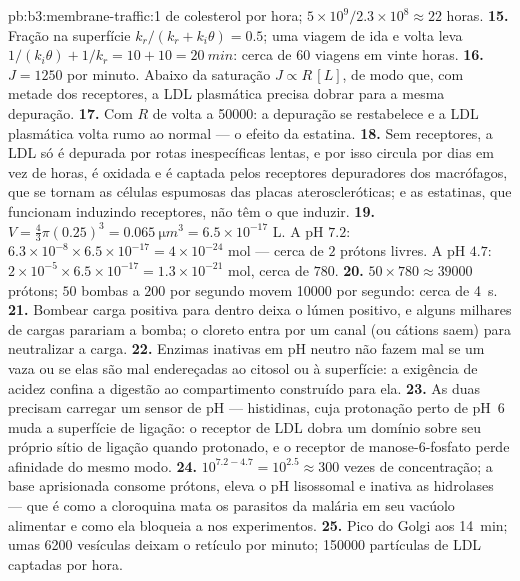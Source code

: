 \begin{solution}{pb:b3:membrane-traffic:1}
de colesterol por hora; $5\times 10^{9}/2.3\times 10^{8} \approx 22$
horas.
\textbf{15.} Fração na superfície $k_{r}/(k_{r} + k_{i}\theta) = 0.5$;
uma viagem de ida e volta leva $1/(k_{i}\theta) + 1/k_{r} = 10 + 10 = \qty{20}{min}$: cerca de $60$ viagens em vinte horas.
\textbf{16.} $J = 1250$ por minuto. Abaixo da saturação
$J \propto R\,[L]$, de modo que, com metade dos receptores, a LDL
plasmática precisa dobrar para a mesma depuração.
\textbf{17.} Com $R$ de volta a \num{50000}: a depuração se restabelece
e a LDL plasmática volta rumo ao normal --- o efeito da estatina.
\textbf{18.} Sem receptores, a LDL só é depurada por rotas
inespecíficas lentas, e por isso circula por dias em vez de horas, é
oxidada e é captada pelos receptores depuradores dos macrófagos, que se
tornam as células espumosas das placas ateroscleróticas; e as
estatinas, que funcionam induzindo receptores, não têm o que induzir.
\textbf{19.} $V = \tfrac{4}{3}\pi(0.25)^{3} = \qty{0.065}{\micro m^3} =
6.5\times 10^{-17}$ L. A pH $7.2$: $6.3\times 10^{-8}\times 6.5\times
10^{-17} = 4\times 10^{-24}$ mol --- cerca de $2$ prótons livres. A pH
$4.7$: $2\times 10^{-5}\times 6.5\times 10^{-17} = 1.3\times 10^{-21}$
mol, cerca de $780$.
\textbf{20.} $50\times 780 \approx \num{39000}$ prótons; $50$ bombas a
$200$ por segundo movem \num{10000} por segundo: cerca de \qty{4}{s}.
\textbf{21.} Bombear carga positiva para dentro deixa o lúmen positivo,
e alguns milhares de cargas parariam a bomba; o cloreto entra por um
canal (ou cátions saem) para neutralizar a carga.
\textbf{22.} Enzimas inativas em pH neutro não fazem mal se um 
vaza ou se elas são mal endereçadas ao citosol ou à superfície: a
exigência de acidez confina a digestão ao compartimento construído para
ela.
\textbf{23.} As duas precisam carregar um sensor de pH --- histidinas,
cuja protonação perto de pH~6 muda a superfície de ligação: o receptor
de LDL dobra um domínio sobre seu próprio sítio de ligação quando
protonado, e o receptor de manose-6-fosfato perde afinidade do mesmo
modo.
\textbf{24.} $10^{7.2 - 4.7} = 10^{2.5} \approx 300$ vezes de
concentração; a base aprisionada consome prótons, eleva o pH lisossomal
e inativa as hidrolases --- que é como a cloroquina mata os parasitos da
malária em seu vacúolo alimentar e como ela bloqueia a  nos
experimentos.
\textbf{25.} Pico do Golgi aos \qty{14}{min}; umas \num{6200} vesículas
deixam o retículo por minuto; \num{150000} partículas de LDL captadas
por hora.
\end{solution}
